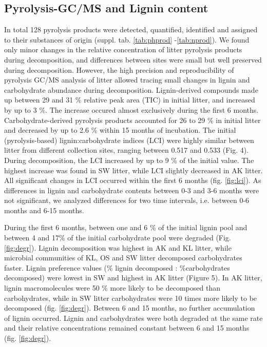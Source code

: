 \subsection*{Pyrolysis-GC/MS and Lignin content}
In total 128 pyrolysis products were detected, quantified, identified and assigned to their substances of origin (suppl. tab. \ref{tab:phprod} -\ref{tab:nprod}). We found only minor changes in the relative concentration of litter pyrolysis products during decomposition, and differences between sites were small but well preserved during decomposition. However, the high precision and reproducibility of pyrolysis GC/MS analysis of litter allowed tracing small changes in lignin and carbohydrate abundance during decomposition. Lignin-derived compounds made up between 29 and 31 \% relative peak area (TIC) in initial litter, and increased by up to 3 \%. The increase occured almost exclusively during the first 6 months. Carbohydrate-derived pyrolysis products accounted for 26 to 29 \% in initial litter and decreased by up to 2.6 \% within 15 months of incubation. The initial (pyrolysis-based) lignin:carbohydrate indices (LCI) were highly similar between litter from different collection sites, ranging between 0.517 
and 0.533 (Fig. 4). During decomposition, the LCI increased by up to 9 \% of the initial value. The highest increase was found in SW litter, while LCI slightly decreased in AK litter. All significant changes in LCI  occurred within the first 6 months (fig. \ref{fig:lci}). As differences in lignin and carbohydrate contents between 0-3 and 3-6 months were not significant, we analyzed differences for two time intervals, i.e. between 0-6 months and 6-15 months.

During the first 6 months, between one and 6 \% of the initial lignin pool and between 4 and 17\% of the initial carbohydrate pool were degraded (Fig. \ref{fig:degr}). Lignin decomposition was highest in AK and KL litter, while microbial communities of KL, OS and SW litter decomposed carbohydrates faster. Lignin preference values (\% lignin decomposed : \%carbohydrates decomposed) were lowest in SW and highest in AK litter (Figure 5). In AK litter, lignin macromolecules were 50 \% more likely to be decomposed than carbohydrates, while in SW litter carbohydrates were 10 times more likely to be decomposed (fig. \ref{fig:degr}). Between 6 and 15 months, no further accumulation of lignin occurred. Lignin and carbohydrates were both degraded at the same rate and their relative concentrations remained constant between 6 and 15 months (fig. \ref{fig:degr}).

